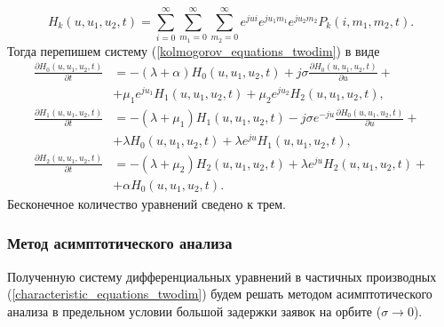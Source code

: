 \begin{equation*}
	H_{k}(u,u_{1},u_{2},t) = \sum_{i=0}^{\infty}
	\sum_{m_{1}=0}^{\infty}
	\sum_{m_{2}=0}^{\infty}  
	e^{jui}e^{ju_{1}m_{1}}e^{ju_{2}m_{2}} P_{k}(i,m_{1},m_{2},t).
\end{equation*}
Тогда перепишем систему (\ref{kolmogorov_equations_twodim}) в виде
\begin{equation} \label{characteristic_equations_twodim}
	\begin{split}
		\frac{{\partial H_{0}(u,u_{1},u_{2},t)}}{{\partial t}} &= -(\lambda + \alpha)H_{0}(u,u_{1},u_{2},t) + j\sigma
		\frac{{\partial H_{0}(u,u_{1},u_{2},t)}}{{\partial u}} +\\  &+ \mu_{1} e^{ju_{1}}H_{1}(u,u_{1},u_{2},t) + \mu_{2}e^{ju_{2}}H_{2}(u,u_{1},u_{2},t) ,
		\\
		\frac{{\partial H_{1}(u,u_{1},u_{2},t)}}{{\partial t}} &= -(\lambda + \mu_{1})H_{1}(u,u_{1},u_{2},t) - j\sigma e^{-ju}
		\frac{{\partial H_{0}(u,u_{1},u_{2},t)}}{{\partial u}} +\\  &+ \lambda H_{0}(u,u_{1},u_{2},t) + \lambda e^{ju}H_{1}(u,u_{1},u_{2},t) ,
		\\
		\frac{{\partial H_{2}(u,u_{1},u_{2},t)}}{{\partial t}} &= -(\lambda + \mu_{2})H_{2}(u,u_{1},u_{2},t)  + \lambda e^{ju}H_{2}(u,u_{1},u_{2},t) +\\  &+ \alpha H_{0}(u,u_{1},u_{2},t).
	\end{split}
\end{equation}  
Бесконечное количество уравнений сведено к трем.

\subsubsection{Метод асимптотического анализа}
Полученную систему дифференциальных уравнений в частичных производных  (\ref{characteristic_equations_twodim}) будем решать методом асимптотического анализа в предельном условии большой задержки заявок на орбите ($\sigma \xrightarrow{} 0$).

